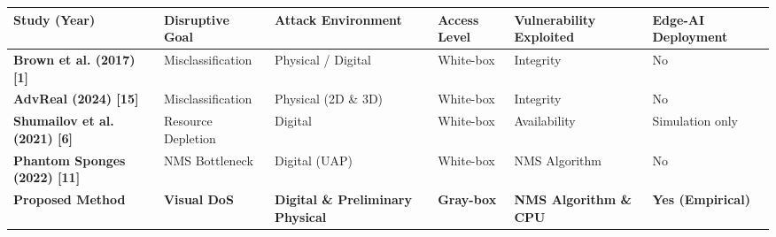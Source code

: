 \documentclass[]{article}
\newcounter{none} %
\begin{document}
{\def\LTcaptype{none} %
\begin{longtable}[]{@{}
  >{\centering\arraybackslash}p{}
  >{\centering\arraybackslash}p{}
  >{\centering\arraybackslash}p{}
  >{\centering\arraybackslash}p{}
  >{\centering\arraybackslash}p{}
  >{\centering\arraybackslash}p{}@{}}
\toprule\noalign{}
\begin{minipage}[b]{\linewidth}\centering
\textbf{Study (Year)}
\end{minipage} & \begin{minipage}[b]{\linewidth}\centering
\textbf{Disruptive Goal}
\end{minipage} & \begin{minipage}[b]{\linewidth}\centering
\textbf{Attack Environment}
\end{minipage} & \begin{minipage}[b]{\linewidth}\centering
\textbf{Access Level}
\end{minipage} & \begin{minipage}[b]{\linewidth}\centering
\textbf{Vulnerability Exploited}
\end{minipage} & \begin{minipage}[b]{\linewidth}\centering
\textbf{Edge-AI Deployment}
\end{minipage} \\
\midrule\noalign{}
\endhead
\bottomrule\noalign{}
\endlastfoot
\textbf{Brown et al. (2017) {[}1{]}} & Misclassification & Physical / Digital & White-box & Integrity & No \\
\textbf{AdvReal (2024) {[}15{]}} & Misclassification & Physical (2D \& 3D) & White-box & Integrity & No \\
\textbf{Shumailov et al. (2021) {[}6{]}} & Resource Depletion & Digital & White-box & Availability & Simulation only \\
\textbf{Phantom Sponges (2022) {[}11{]}} & NMS Bottleneck & Digital (UAP) & White-box & NMS Algorithm & No \\
\textbf{Proposed Method} & \textbf{Visual DoS} &
\textbf{Digital \& Preliminary Physical} & \textbf{Gray-box} &
\textbf{NMS Algorithm \& CPU} & \textbf{Yes (Empirical)} \\
\end{longtable}
}
\end{document}
